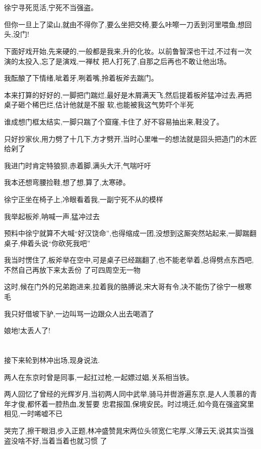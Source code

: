 ﻿\documentclass[12pt]{article}
\begin{document}
\section{}

徐宁寻死觅活,宁死不当强盗。

但你一旦上了梁山,就由不得你了,要么坐把交椅,要么咔嚓一刀丢到河里喂鱼,想回头,没门!

下面好戏开始,先来硬的,一般都是我来,升的化妆。以前鲁智深也干过,不过有一次演的太投入,忘了是演戏,一禅杖
把人打死了,自那之后再也不敢让他出场。

我酝酿了下情绪,呲着牙,咧着嘴,拎着板斧去踹门。

本来打算的好好的,一脚把门踹烂,最好是木屑满天飞,然后提着板斧猛冲过去,再把桌子砸个稀巴烂,估计他就是不服
软,也能被我这气势吓个半死

谁成想门框太结实,一脚只踹了个窟窿,卡住了,好不容易抽出来,鞋没了。

只好抄家伙,用力劈了十几下,方才劈开,当时心里唯一的想法就是回头把造门的木匠给剁了

我进门时肯定特狼狈,赤着脚,满头大汗,气喘吁吁

我本还想弯腰捡鞋,想了想,算了,太寒碜。

徐宁正坐在椅子上,冷眼看着我,一副宁死不从的模样

我举起板斧,呐喊一声,猛冲过去

预料中徐宁就算不大喊``好汉饶命'',也得缩成一团,没想到这厮突然站起来,一脚踹翻桌子,伸着头说``你砍死我吧''

我当时愣住了,板斧举在空中,可是桌子已经踹翻了,也不能老举着,总得劈点东西吧,不然自己再放下来太丢份
了\dldots 可四周空无一物\dldots

这时,候在门外的兄弟跑进来,拉着我的胳膊说,宋大哥有令,决不能伤了徐宁一根寒毛

我只好借坡下驴,一边叫骂一边跟众人出去喝酒了

娘地!太丢人了!

\section{}

接下来轮到林冲出场,现身说法.

两人在东京时曾是同事,一起扛过枪,一起嫖过娼,关系相当铁。

两人回忆了曾经的光辉岁月,当初两人同中武举,骑马并辔游遍东京,是人人羡慕的青年才俊,都怀着一腔热血,发誓要
忠君报国,保境安民。时过境迁,如今竟在强盗窝里相见,一时唏嘘不已

哭完了,擦干眼泪,步入正题,林冲盛赞晁宋两位头领宽仁宅厚,义薄云天,说其实当强盗没啥不好,当着当着也就习惯
了\dldots
\end{document}
